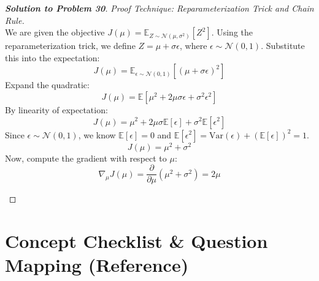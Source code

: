 \documentclass[11pt, a4paper]{article}
\theoremstyle{definition}
\theoremstyle{remark}
\newcommand{\E}{\mathbb{E}}
\begin{document}
\begin{proof}[\textbf{Solution to Problem 30}]
\textit{Proof Technique: Reparameterization Trick and Chain Rule.} \\
We are given the objective $J(\mu) = \E_{Z \sim \mathcal{N}(\mu, \sigma^2)}[Z^2]$.
Using the reparameterization trick, we define $Z = \mu + \sigma\epsilon$, where $\epsilon \sim \mathcal{N}(0, 1)$.
Substitute this into the expectation:
\[ J(\mu) = \E_{\epsilon \sim \mathcal{N}(0, 1)}[(\mu + \sigma\epsilon)^2] \]
Expand the quadratic:
\[ J(\mu) = \E[\mu^2 + 2\mu\sigma\epsilon + \sigma^2\epsilon^2] \]
By linearity of expectation:
\[ J(\mu) = \mu^2 + 2\mu\sigma\E[\epsilon] + \sigma^2\E[\epsilon^2] \]
Since $\epsilon \sim \mathcal{N}(0, 1)$, we know $\E[\epsilon] = 0$ and $\E[\epsilon^2] = \text{Var}(\epsilon) + (\E[\epsilon])^2 = 1$.
\[ J(\mu) = \mu^2 + \sigma^2 \]
Now, compute the gradient with respect to $\mu$:
\[ \nabla_\mu J(\mu) = \frac{\partial}{\partial \mu} (\mu^2 + \sigma^2) = 2\mu \]

\vspace{1em}
\begin{center}
\end{center}
\end{proof}

\newpage

\section{Concept Checklist \& Question Mapping (Reference)}
\end{document}
